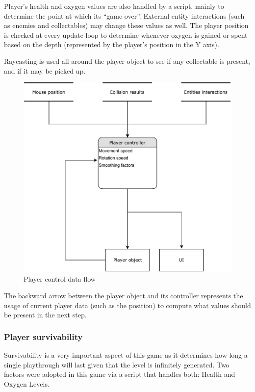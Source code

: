 \documentclass[11pt]{article}
\begin{document}
Player’s health and oxygen values are also handled by a script, mainly to determine the point at which its “game over”. External entity interactions (such as enemies and collectables) may change these values as well. The player position is checked at every update loop to determine whenever oxygen is gained or spent based on the depth (represented by the player’s position in the Y axis).

Raycasting is used all around the player object to see if any collectable is present, and if it may be picked up. 

\begin{figure}[H]
  \centering
  \includegraphics[width=1.0\textwidth]{figures/player_controller}
  \caption{Player control data flow}
\end{figure}

The backward arrow between the player object and its controller represents the usage of current player data (such as the position) to compute what values should be present in the next step.

\subsubsection{Player survivability}
Survivability is a very important aspect of this game as it determines how long a single playthrough will last given that the level is infinitely generated. Two factors were adopted in this game via a script that handles both: Health and Oxygen Levels.
\end{document}
